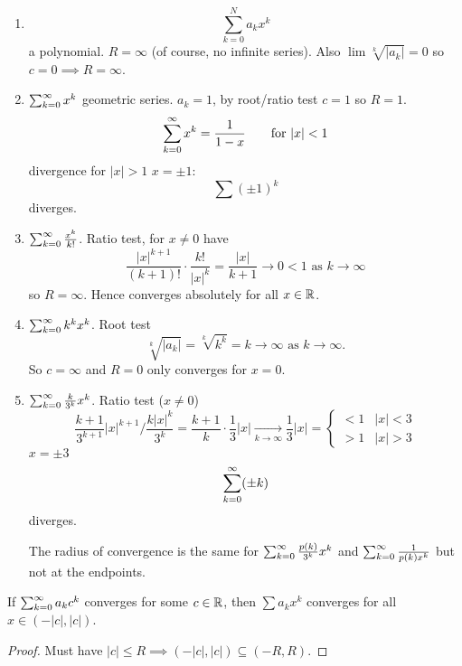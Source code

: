 \documentclass[10pt, a4paper]{article}
\newcommand{\limas}[3][n]{#2 \rightarrow #3 \text{ as } #1 \rightarrow \infty}
\begin{document}
\begin{example}\phantom{}
    \begin{enumerate}[label = (\roman*)]
        \item
        \[
        \sum_{k = 0}^{N}a_kx ^ k
        \]
        a polynomial.
        $R = \infty$
        (of course,
        no infinite series).
        Also $\lim\sqrt[k]{|a_k|} = 0$ so $c = 0 \implies R = \infty$.

        \item $\sum_{k = 0}^{\infty} x ^ k$ geometric series.
        $a_k = 1$,
        by root/ratio test $c = 1$ so $R = 1$.
        \[
        \sum_{k = 0}^{\infty} x ^ k = \frac{1}{1 - x}\qquad\text{for } |x| < 1
        \]
        divergence for $|x| > 1$
        $x = \pm 1$:
        \[
        \sum(\pm 1) ^ k
        \]
        diverges.

        \item $\sum_{k = 0}^{\infty}\frac{x ^ k}{k!}$.
        Ratio test,
        for $x \neq 0$ have
        \[
        \frac{|x| ^ {k + 1}}{(k + 1)!} \cdot \frac{k!}{|x| ^ k} = \limas[k]{\frac{|x|}{k + 1}}{0 < 1}
        \]
        so $R = \infty$.
        Hence converges absolutely for all $x \in \mathbb{R}$.

        \item $\sum_{k = 0}^{\infty} k ^ kx ^ k$.
        Root test
        \[
        \sqrt[k]{|a_k|} = \sqrt[k]{k ^ k} = \limas[k]{k}{\infty}.
        \]
        So $c = \infty$ and $R = 0$ only converges for $x = 0$.

        \item $\sum_{k = 0}^{\infty}\frac{k}{3 ^ k}x ^ k$.
        Ratio test
        ($x \neq 0$)
        \[
        \frac{k + 1}{3 ^ {k + 1}}|x| ^ {k + 1} / \frac{k|x| ^ k}{3 ^ k} = \frac{k + 1}{k}\cdot\frac{1}{3}|x| \xrightarrow[k \rightarrow \infty]{} \frac{1}{3}|x| = \begin{cases}
            < 1 & |x| < 3 \\
            > 1 & |x| > 3
        \end{cases}
        \]
        $x = \pm 3$
        \[
        \sum_{k = 0}^{\infty}(\pm k)
        \]
        diverges.

        The radius of convergence is the same for $\sum_{k = 0}^{\infty}\frac{p(k)}{3 ^ k}x ^ k$ and $\sum_{k = 0}^{\infty}\frac{1}{p(k)x ^ k}$ but not at the endpoints.
    \end{enumerate}
\end{example}

\begin{corollary}
    If $\sum_{k = 0}^{\infty} a_kc ^ k$ converges for some $c \in \mathbb{R}$,
    then $\sum a_kx ^ k$ converges for all $x \in (-|c|, |c|)$.

    \begin{proof}
        Must have $|c| \leq R \implies (-|c|, |c|) \subseteq (-R, R)$.
    \end{proof}
\end{corollary}
\end{document}
